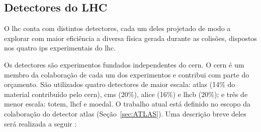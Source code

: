 \subsection{Detectores do LHC}
\label{ssec:lhc_detectores}

O \gls{lhc} conta com distintos detectores, 
cada um deles projetado de modo a explorar com maior eficiência 
a diversa física gerada durante as colisões, dispostos nos quatro \glspl{ip}
experimentais do \gls{lhc}.


Os detectores são experimentos fundados independentes do \gls{cern}. O
\gls{cern} é um membro da colaboração de cada um dos experimentos e contribui com parte do
orçamento. São utilizados quatro detectores de maior
escala: \acrshort{atlas} (14\% do material contribuído pelo \gls{cern}),
\acrshort{cms} (20\%), \acrshort{alice} (16\%) e \acrshort{lhcb} (20\%); e três de menor escala:
\acrshort{totem}, \acrshort{lhcf} e \acrshort{moedal}. O trabalho atual está definido no
escopo da colaboração do detector \acrshort{atlas} (Seção~\ref{sec:ATLAS}). 
Uma descrição breve deles será realizada a seguir
\cite{lecture_slides_1,lecture_slides_2,closerLook}: 

